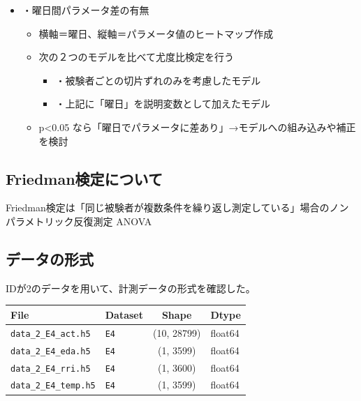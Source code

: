 \documentclass[a4paper,11pt]{article}
\begin{document}
\begin{itemize}
  \item ・曜日間パラメータ差の有無
    \begin{itemize}
      \item 横軸＝曜日、縦軸＝パラメータ値のヒートマップ作成
      \item 次の２つのモデルを比べて尤度比検定を行う
        \begin{itemize}
          \item ・被験者ごとの切片ずれのみを考慮したモデル
          \item ・上記に「曜日」を説明変数として加えたモデル
        \end{itemize}
      \item p<0.05 なら「曜日でパラメータに差あり」→モデルへの組み込みや補正を検討
    \end{itemize}
\end{itemize}




\subsection*{Friedman検定について}
Friedman検定は「同じ被験者が複数条件を繰り返し測定している」場合のノンパラメトリック反復測定 ANOVA


\subsection*{データの形式}
IDが2のデータを用いて、計測データの形式を確認した。
\begin{table}[ht]
  \centering
  \begin{tabular}{|l|l|c|l|}
    \hline
    \textbf{File} & \textbf{Dataset} & \textbf{Shape} & \textbf{Dtype} \\ \hline
    \texttt{data\_2\_E4\_act.h5} & \texttt{E4} & (10, 28799) & float64 \\ \hline
    \texttt{data\_2\_E4\_eda.h5} & \texttt{E4} & (1, 3599)   & float64 \\ \hline
    \texttt{data\_2\_E4\_rri.h5} & \texttt{E4} & (1, 3600)   & float64 \\ \hline
    \texttt{data\_2\_E4\_temp.h5} & \texttt{E4} & (1, 3599)   & float64 \\ \hline
  \end{tabular}
\end{table}
\end{document}

